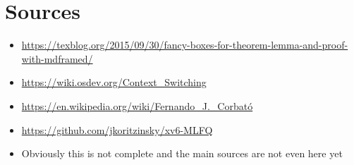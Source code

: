 \documentclass{report}
\begin{document}
\chapter*{Sources}

\begin{itemize}
    \item \url{https://texblog.org/2015/09/30/fancy-boxes-for-theorem-lemma-and-proof-with-mdframed/}
    \item \url{https://wiki.osdev.org/Context_Switching}
    \item \url{https://en.wikipedia.org/wiki/Fernando_J._Corbató}
    \item \url{https://github.com/jkoritzinsky/xv6-MLFQ}
    \item Obviously this is not complete and the main sources are not even here yet
\end{itemize}
\end{document}
